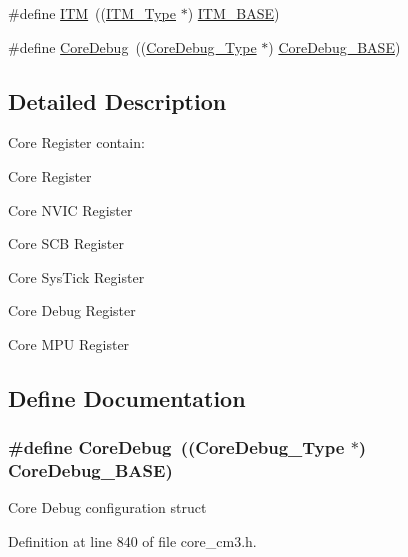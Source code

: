 \begin{DoxyCompactItemize}
\item 
\#define \hyperlink{group___c_m_s_i_s__core__register_gabae7cdf882def602cb787bb039ff6a43}{\-I\-T\-M}~((\hyperlink{struct_i_t_m___type}{\-I\-T\-M\-\_\-\-Type} $\ast$)           \hyperlink{group___c_m_s_i_s__core__register_gadd76251e412a195ec0a8f47227a8359e}{\-I\-T\-M\-\_\-\-B\-A\-S\-E})
\item 
\#define \hyperlink{group___c_m_s_i_s__core__register_gab6e30a2b802d9021619dbb0be7f5d63d}{\-Core\-Debug}~((\hyperlink{struct_core_debug___type}{\-Core\-Debug\-\_\-\-Type} $\ast$)     \hyperlink{group___c_m_s_i_s__core__register_ga680604dbcda9e9b31a1639fcffe5230b}{\-Core\-Debug\-\_\-\-B\-A\-S\-E})
\end{DoxyCompactItemize}


\subsection{\-Detailed \-Description}
\-Core \-Register contain\-:
\begin{DoxyItemize}
\item \-Core \-Register
\item \-Core \-N\-V\-I\-C \-Register
\item \-Core \-S\-C\-B \-Register
\item \-Core \-Sys\-Tick \-Register
\item \-Core \-Debug \-Register
\item \-Core \-M\-P\-U \-Register 
\end{DoxyItemize}

\subsection{\-Define \-Documentation}
\hypertarget{group___c_m_s_i_s__core__register_gab6e30a2b802d9021619dbb0be7f5d63d}{
\subsubsection[{\-Core\-Debug}]{\setlength{\rightskip}{0pt plus 5cm}\#define {\bf \-Core\-Debug}~(({\bf \-Core\-Debug\-\_\-\-Type} $\ast$)     {\bf \-Core\-Debug\-\_\-\-B\-A\-S\-E})}}\label{group___c_m_s_i_s__core__register_gab6e30a2b802d9021619dbb0be7f5d63d}
\-Core \-Debug configuration struct 

\-Definition at line 840 of file core\-\_\-cm3.\-h.

